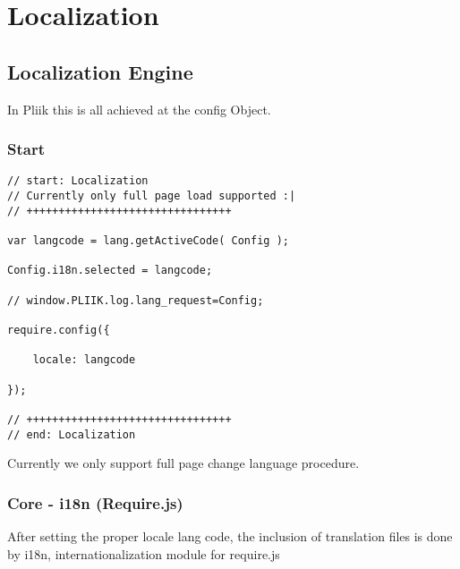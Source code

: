 
\section{Localization}


\subsection{Localization Engine}

In Pliik this is all achieved at the config Object.

\subsubsection{Start}

%    

\begin{lstlisting}[caption='app/js/config.js']
// start: Localization
// Currently only full page load supported :|
// ++++++++++++++++++++++++++++++++

var langcode = lang.getActiveCode( Config );

Config.i18n.selected = langcode;

// window.PLIIK.log.lang_request=Config;

require.config({

    locale: langcode

}); 

// ++++++++++++++++++++++++++++++++ 
// end: Localization

\end{lstlisting}


Currently we only support full page change language procedure. \\

\subsubsection{Core - i18n (Require.js)}

After setting the proper locale lang code, 
the inclusion of translation files is done by i18n,
internationalization module for require.js

